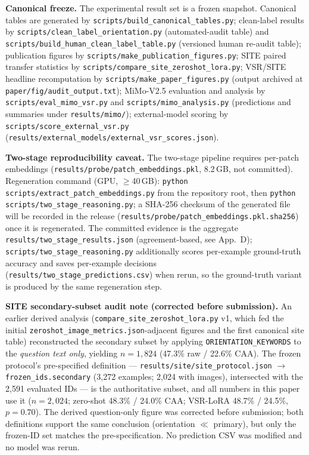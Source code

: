 \textbf{Canonical freeze.} The experimental result set is a frozen snapshot. Canonical tables are generated by
\texttt{scripts/build\_canonical\_tables.py}; clean-label results by
\texttt{scripts/clean\_label\_orientation.py} (automated-audit table) and
\texttt{scripts/build\_human\_clean\_label\_table.py} (versioned human
re-audit table); publication figures by
\texttt{scripts/make\_publication\_figures.py}; SITE paired transfer statistics
by \texttt{scripts/compare\_site\_zeroshot\_lora.py}; VSR/SITE headline
recomputation by \texttt{scripts/make\_paper\_figures.py} (output archived at
\texttt{paper/fig/audit\_output.txt}); MiMo-V2.5 evaluation and analysis by
\texttt{scripts/eval\_mimo\_vsr.py} and \texttt{scripts/mimo\_analysis.py}
(predictions and summaries under \texttt{results/mimo/}); external-model
scoring by \texttt{scripts/score\_external\_vsr.py}
(\texttt{results/external\_models/external\_vsr\_scores.json}).

\textbf{Two-stage reproducibility caveat.} The two-stage pipeline requires
per-patch embeddings (\texttt{results/probe/patch\_embeddings.pkl}, 8.2\,GB,
not committed). Regeneration command (GPU, $\ge$40\,GB):
\texttt{python scripts/extract\_patch\_embeddings.py} from the repository
root, then \texttt{python scripts/two\_stage\_reasoning.py}; a SHA-256
checksum of the generated file will be recorded in the release
(\texttt{results/probe/patch\_embeddings.pkl.sha256}) once it is regenerated.
The committed evidence is the aggregate
\texttt{results/two\_stage\_results.json} (agreement-based, see App.~D);
\texttt{scripts/two\_stage\_reasoning.py} additionally scores per-example
ground-truth accuracy and saves per-example decisions
(\texttt{results/two\_stage\_predictions.csv}) when rerun, so the
ground-truth variant is produced by the same regeneration step.

\textbf{SITE secondary-subset audit note (corrected before submission).} An
earlier derived analysis (\texttt{compare\_site\_zeroshot\_lora.py} v1, which
fed the initial \texttt{zeroshot\_image\_metrics.json}-adjacent figures and the
first canonical site table) reconstructed the secondary subset by applying
\verb|ORIENTATION_KEYWORDS| to the \emph{question text only}, yielding
$n{=}1{,}824$ (47.3\% raw / 22.6\% CAA). The frozen protocol's pre-specified
definition --- \texttt{results/site/site\_protocol.json}
$\rightarrow$ \texttt{frozen\_ids.secondary} (3{,}272 examples; 2{,}024 with
images), intersected with the 2{,}591 evaluated IDs --- is the authoritative
subset, and all numbers in this paper use it ($n{=}2{,}024$; zero-shot 48.3\% /
24.0\% CAA; VSR-LoRA 48.7\% / 24.5\%, $p{=}0.70$). The derived question-only
figure was corrected before submission; both definitions support the same
conclusion (orientation $\ll$ primary), but only the frozen-ID set matches the
pre-specification. No prediction CSV was modified and no model was rerun.

